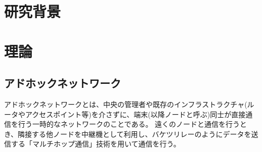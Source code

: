 \documentclass[a4paper, 10pt]{ltjsarticle}
\begin{document}
\setlength{\columnsep}{7.5mm}

\twocolumn[
    \begin{center}
        {\vspace{-1em}}

        {\fontsize{15pt}{15pt}\selectfont{アドホックネットワークについての研究(仮)}}

        {\vspace{1.5em}}

        {\fontsize{13pt}{13pt}\selectfont{}}
    \end{center}



    \begin{flushright}
      {\fontsize{11pt}{11pt}\selectfont{T5-17　末廣隼人\\}}
      {\fontsize{11pt}{11pt}\selectfont{指導教員　髙﨑和之}}
    \end{flushright}

    \vspace{1em}

    \thispagestyle{empty}
]

\section{研究背景}


\section{理論}
\subsection{アドホックネットワーク}
アドホックネットワークとは、中央の管理者や既存のインフラストラクチャ(ルータやアクセスポイント等)を介さずに、端末(以降ノードと呼ぶ)同士が直接通信を行う一時的なネットワークのことである。
遠くのノードと通信を行うとき、隣接する他ノードを中継機として利用し、バケツリレーのようにデータを送信する「マルチホップ通信」技術を用いて通信を行う。%
\end{document}
